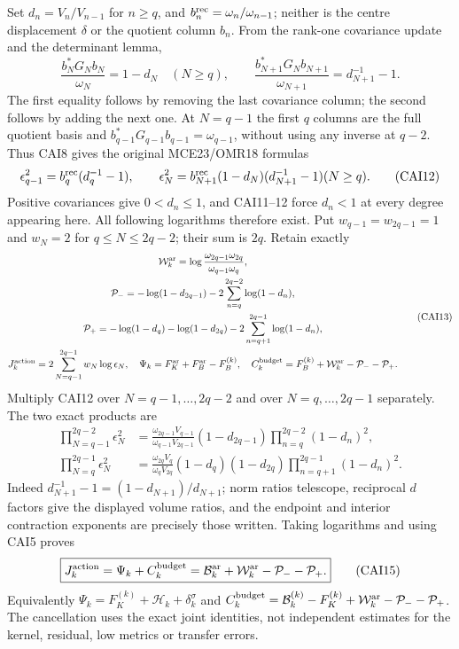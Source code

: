 \documentclass[11pt,a4paper]{article}
\begin{document}
Set $d_n=V_n/V_{n-1}$ for $n\ge q$, and
$b_n^{\rm rec}=\omega_n/\omega_{n-1}$; neither is the centre displacement
$\delta$ or the quotient column $b_n$. From the rank-one covariance
update and the determinant lemma,
\[
 \frac{b_N^*G_Nb_N}{\omega_N}=1-d_N\quad(N\ge q),\qquad
 \frac{b_{N+1}^*G_Nb_{N+1}}{\omega_{N+1}}=d_{N+1}^{-1}-1.
\]
The first equality follows by removing the last covariance column;
the second follows by adding the next one. At $N=q-1$ the first $q$
columns are the full quotient basis and
$b_{q-1}^*G_{q-1}b_{q-1}=\omega_{q-1}$, without using any inverse at
$q-2$. Thus CAI8 gives the original MCE23/OMR18 formulas
\[
 \epsilon_{q-1}^2=b_q^{\rm rec}(d_q^{-1}-1),\qquad
 \epsilon_N^2=b_{N+1}^{\rm rec}(1-d_N)(d_{N+1}^{-1}-1) (N\ge q).
 \tag{CAI12}
\]
Positive covariances give $0<d_n\le1$, and CAI11--12 force $d_n<1$
at every degree appearing here. All following logarithms therefore
exist. Put $w_{q-1}=w_{2q-1}=1$ and $w_N=2$ for $q\le N\le2q-2$;
their sum is $2q$. Retain exactly
\[
\begin{gathered}
 \mathcal W_k^{\rm ar}=\log\frac{\omega_{2q-1}\omega_{2q}}
                                      {\omega_{q-1}\omega_q},\\
 \mathcal P_-=-\log(1-d_{2q-1})-2\sum_{n=q}^{2q-2}\log(1-d_n),\\
 \mathcal P_+=-\log(1-d_q)-\log(1-d_{2q})
                              -2\sum_{n=q+1}^{2q-1}\log(1-d_n),\\
 J_k^{\rm action}=2\sum_{N=q-1}^{2q-1}w_N\log\epsilon_N,\quad
 \Psi_k=F_K^{\rm ar}+F_B^{\rm ar}-F_B^{(k)},\quad
 C_k^{\rm budget}=F_B^{(k)}+\mathcal W_k^{\rm ar}-\mathcal P_--\mathcal P_+.
\end{gathered}\tag{CAI13}
\]
Multiply CAI12 over $N=q-1,\ldots,2q-2$ and over
$N=q,\ldots,2q-1$ separately. The two exact products are
\[
\begin{aligned}
 \prod_{N=q-1}^{2q-2}\epsilon_N^2
 &=\frac{\omega_{2q-1}V_{q-1}}{\omega_{q-1}V_{2q-1}}
            (1-d_{2q-1})\prod_{n=q}^{2q-2}(1-d_n)^2,\\
 \prod_{N=q}^{2q-1}\epsilon_N^2
 &=\frac{\omega_{2q}V_q}{\omega_qV_{2q}}
            (1-d_q)(1-d_{2q})\prod_{n=q+1}^{2q-1}(1-d_n)^2.
\end{aligned}\tag{CAI14}
\]
Indeed $d_{N+1}^{-1}-1=(1-d_{N+1})/d_{N+1}$; norm ratios telescope,
reciprocal $d$ factors give the displayed volume ratios, and the
endpoint and interior contraction exponents are precisely those written.
Taking logarithms and using CAI5 proves
\[
 \boxed{J_k^{\rm action}=\Psi_k+C_k^{\rm budget}
    =\mathcal B_k^{\rm ar}+\mathcal W_k^{\rm ar}-\mathcal P_--\mathcal P_+.}
 \tag{CAI15}
\]
Equivalently $\Psi_k=F_K^{(k)}+\mathcal H_k+\delta_k^\sigma$ and
$C_k^{\rm budget}=\mathcal B_k^{(k)}-F_K^{(k)}+
\mathcal W_k^{\rm ar}-\mathcal P_--\mathcal P_+$.
The cancellation uses the exact joint identities, not independent
estimates for the kernel, residual, low metrics or transfer errors.
\end{document}
